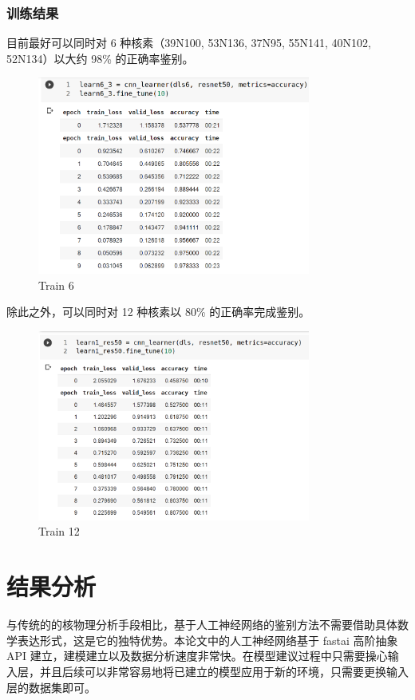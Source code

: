 \documentclass[AutoFakeBold]{LZUThesis}
\begin{document}
\subsubsection{训练结果}
目前最好可以同时对 6 种核素（39N100, 53N136, 37N95, 55N141, 40N102, 52N134）以大约 98\% 的正确率鉴别。

\begin{figure}[H]
    \centering
    \includegraphics[width=0.8\textwidth]{figures/train6.png}
    \caption{Train 6}
    \label{fig_train6}
\end{figure}

除此之外，可以同时对 12 种核素以 80\% 的正确率完成鉴别。

\begin{figure}[H]
    \centering
    \includegraphics[width=0.8\textwidth]{figures/train12.png}
    \caption{Train 12}
    \label{fig_train12}
\end{figure}



\section{结果分析}
与传统的的核物理分析手段相比，基于人工神经网络的鉴别方法不需要借助具体数学表达形式，这是它的独特优势。本论文中的人工神经网络基于 fastai 高阶抽象 API 建立，建模建立以及数据分析速度非常快。在模型建议过程中只需要操心输入层，并且后续可以非常容易地将已建立的模型应用于新的环境，只需要更换输入层的数据集即可。
\end{document}
